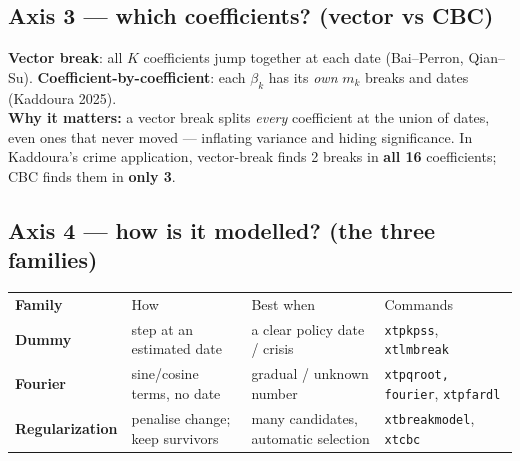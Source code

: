 \documentclass[11pt,a4paper]{article}
\newcommand{\cmd}[1]{\texttt{\textcolor{corange}{#1}}}
\newcommand{\hlt}[2]{\textcolor{#1}{\textbf{#2}}}
\begin{document}
\subsection{Axis 3 --- which coefficients? (vector vs CBC)}
\begin{cmpbox}
\hlt{cblue}{Vector break}: all $K$ coefficients jump together at each date (Bai--Perron, Qian--Su).
\hlt{cgreen}{Coefficient-by-coefficient}: each $\beta_k$ has its \emph{own} $m_k$ breaks and dates
(Kaddoura 2025).\\[3pt]
\textbf{Why it matters:} a vector break splits \emph{every} coefficient at the union of dates, even
ones that never moved --- inflating variance and hiding significance. In Kaddoura's crime
application, vector-break finds 2 breaks in \textbf{all 16} coefficients; CBC finds them in
\textbf{only 3}.
\end{cmpbox}

\subsection{Axis 4 --- how is it modelled? (the three families)}
\begin{center}
\begin{tabular}{@{}>{\bfseries}p{2.6cm} p{4.4cm} p{4.2cm} p{3.4cm}@{}}
\rowcolor{cgreen}\color{white}Family & \color{white}How & \color{white}Best when & \color{white}Commands\\
Dummy & step at an estimated date & a clear policy date / crisis & \cmd{xtpkpss}, \cmd{xtlmbreak}\\
Fourier & sine/cosine terms, no date & gradual / unknown number & \cmd{xtpqroot, fourier}, \cmd{xtpfardl}\\
Regularization & penalise change; keep survivors & many candidates, automatic selection & \cmd{xtbreakmodel}, \cmd{xtcbc}\\
\end{tabular}
\end{center}
\end{document}
